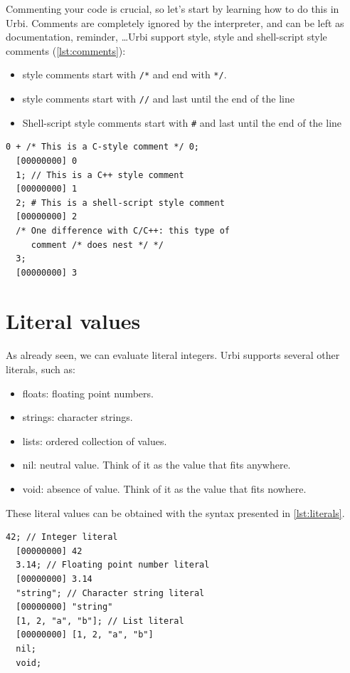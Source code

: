 \documentclass[openright,twoside,12pt]{report}
\newcommand{\urbi}{Urbi\xspace}
\newcommand{\lst}[1]{\autoref{lst:#1}}
\begin{document}
Commenting your code is crucial, so let's start by learning how to do
this in \urbi. Comments are completely ignored by the interpreter, and
can be left as documentation, reminder, \ldots \urbi support \C style,
\Cxx style and shell-script style comments (\lst{comments}):

\begin{itemize}
\item \C style comments start with \texttt{/*} and end with \texttt{*/}.
\item \Cxx style comments start with \texttt{//} and last until the
  end of the line
\item Shell-script style comments start with \texttt{\#} and last
  until the end of the line
\end{itemize}


\begin{lstlisting}[caption=Comments in \urbi, label=lst:comments]
  0 + /* This is a C-style comment */ 0;
  [00000000] 0
  1; // This is a C++ style comment
  [00000000] 1
  2; # This is a shell-script style comment
  [00000000] 2
  /* One difference with C/C++: this type of
     comment /* does nest */ */
  3;
  [00000000] 3
\end{lstlisting}


\section{Literal values}

As already seen, we can evaluate literal integers. \urbi supports
several other literals, such as:

\begin{itemize}
\item floats: floating point numbers.
\item strings: character strings.
\item lists: ordered collection of values.
\item nil: neutral value. Think of it as the value that fits anywhere.
\item void: absence of value. Think of it as the value that fits nowhere.
\end{itemize}

These literal values can be obtained with the syntax presented in
\lst{literals}.

\begin{lstlisting}[caption=Literals,label=lst:literals]
  42; // Integer literal
  [00000000] 42
  3.14; // Floating point number literal
  [00000000] 3.14
  "string"; // Character string literal
  [00000000] "string"
  [1, 2, "a", "b"]; // List literal
  [00000000] [1, 2, "a", "b"]
  nil;
  void;
\end{lstlisting}
\end{document}
